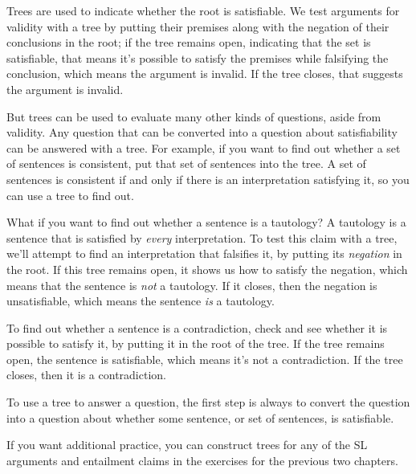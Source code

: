 Trees are used to indicate whether the root is satisfiable. We test arguments for validity with a tree by putting their premises along with the negation of their conclusions in the root; if the tree remains open, indicating that the set is satisfiable, that means it's possible to satisfy the premises while falsifying the conclusion, which means the argument is invalid. If the tree closes, that suggests the argument is invalid.

But trees can be used to evaluate many other kinds of questions, aside from validity. Any question that can be converted into a question about satisfiability can be answered with a tree. For example, if you want to find out whether a set of sentences is consistent, put that set of sentences into the tree. A set of sentences is consistent if and only if there is an interpretation satisfying it, so you can use a tree to find out.

What if you want to find out whether a sentence is a tautology? A tautology is a sentence that is satisfied by \emph{every} interpretation. To test this claim with a tree, we'll attempt to find an interpretation that falsifies it, by putting its \emph{negation} in the root. If this tree remains open, it shows us how to satisfy the negation, which means that the sentence is \emph{not} a tautology. If it closes, then the negation is unsatisfiable, which means the sentence \emph{is} a tautology.

To find out whether a sentence is a contradiction, check and see whether it is possible to satisfy it, by putting it in the root of the tree. If the tree remains open, the sentence is satisfiable, which means it's not a contradiction. If the tree closes, then it is a contradiction.

To use a tree to answer a question, the first step is always to convert the question into a question about whether some sentence, or set of sentences, is satisfiable. 


\practiceproblems
If you want additional practice, you can construct trees for any of the SL arguments and entailment claims in the exercises for the previous two chapters.

